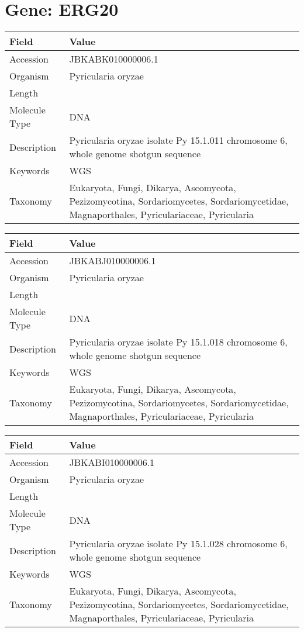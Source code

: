 \documentclass[10pt]{article}
\begin{document}
\section{Gene: ERG20}
{\footnotesize
\begin{longtable}{>{\raggedright\arraybackslash}p{4.5cm} >{\raggedright\arraybackslash}p{11.5cm}}
\textbf{Field} & \textbf{Value} \\
\hline
Accession & JBKABK010000006.1 \\
Organism & Pyricularia oryzae \\
Length & 6072706 \\
Molecule Type & DNA \\
Description & Pyricularia oryzae isolate Py 15.1.011 chromosome 6, whole genome shotgun sequence \\
Keywords & WGS \\
Taxonomy & Eukaryota, Fungi, Dikarya, Ascomycota, Pezizomycotina, Sordariomycetes, Sordariomycetidae, Magnaporthales, Pyriculariaceae, Pyricularia \\
\end{longtable}
}

\vspace{1em}
{\footnotesize
\begin{longtable}{>{\raggedright\arraybackslash}p{4.5cm} >{\raggedright\arraybackslash}p{11.5cm}}
\textbf{Field} & \textbf{Value} \\
\hline
Accession & JBKABJ010000006.1 \\
Organism & Pyricularia oryzae \\
Length & 5939575 \\
Molecule Type & DNA \\
Description & Pyricularia oryzae isolate Py 15.1.018 chromosome 6, whole genome shotgun sequence \\
Keywords & WGS \\
Taxonomy & Eukaryota, Fungi, Dikarya, Ascomycota, Pezizomycotina, Sordariomycetes, Sordariomycetidae, Magnaporthales, Pyriculariaceae, Pyricularia \\
\end{longtable}
}

\vspace{1em}
{\footnotesize
\begin{longtable}{>{\raggedright\arraybackslash}p{4.5cm} >{\raggedright\arraybackslash}p{11.5cm}}
\textbf{Field} & \textbf{Value} \\
\hline
Accession & JBKABI010000006.1 \\
Organism & Pyricularia oryzae \\
Length & 6054307 \\
Molecule Type & DNA \\
Description & Pyricularia oryzae isolate Py 15.1.028 chromosome 6, whole genome shotgun sequence \\
Keywords & WGS \\
Taxonomy & Eukaryota, Fungi, Dikarya, Ascomycota, Pezizomycotina, Sordariomycetes, Sordariomycetidae, Magnaporthales, Pyriculariaceae, Pyricularia \\
\end{longtable}
}
\end{document}
